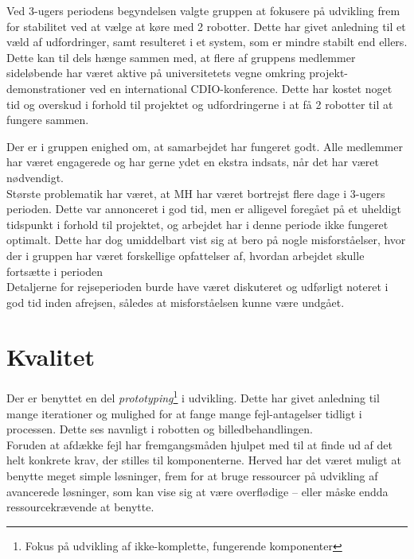 Ved 3-ugers periodens begyndelsen valgte gruppen at fokusere på udvikling frem for stabilitet ved at vælge at køre med 2 robotter. Dette har givet anledning til et væld af udfordringer, samt resulteret i et system, som er mindre stabilt end ellers. Dette kan til dels hænge sammen med, at flere af gruppens medlemmer sideløbende har været aktive på universitetets vegne omkring projekt-demonstrationer ved en international CDIO-konference. Dette har kostet noget tid og overskud i forhold til projektet og udfordringerne i at få 2 robotter til at fungere sammen.

Der er i gruppen enighed om, at samarbejdet har fungeret godt. Alle medlemmer har været engagerede og har gerne ydet en ekstra indsats, når det har været nødvendigt.\\
Største problematik har været, at MH har været bortrejst flere dage i 3-ugers perioden. Dette var annonceret i god tid, men er alligevel foregået på et uheldigt tidspunkt i forhold til projektet, og arbejdet har i denne periode ikke fungeret optimalt. Dette har dog umiddelbart vist sig at bero på nogle misforståelser, hvor der i gruppen har været forskellige opfattelser af, hvordan arbejdet skulle fortsætte i perioden\\
Detaljerne for rejseperioden burde have været diskuteret og udførligt noteret i god tid inden afrejsen, således at misforståelsen kunne være undgået.

\section{Kvalitet}
Der er benyttet en del \textit{prototyping}\footnote{Fokus på udvikling af ikke-komplette, fungerende komponenter} i udvikling. Dette har givet anledning til mange iterationer og mulighed for at fange mange fejl-antagelser tidligt i processen. Dette ses navnligt i robotten og billedbehandlingen.\\
Foruden at afdække fejl har fremgangsmåden hjulpet med til at finde ud af det helt konkrete krav, der stilles til komponenterne. Herved har det været muligt at benytte meget simple løsninger, frem for at bruge ressourcer på udvikling af avancerede løsninger, som kan vise sig at være overflødige -- eller måske endda ressourcekrævende at benytte.